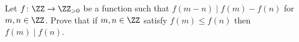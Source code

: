 Let $f \colon \ZZ \to \ZZ_{>0}$ be a function such that
$f(m-n) \mid f(m) - f(n)$ for $m,n \in \ZZ$.
Prove that if $m,n \in \ZZ$ satisfy $f(m) \le f(n)$
then $f(m) \mid f(n)$.